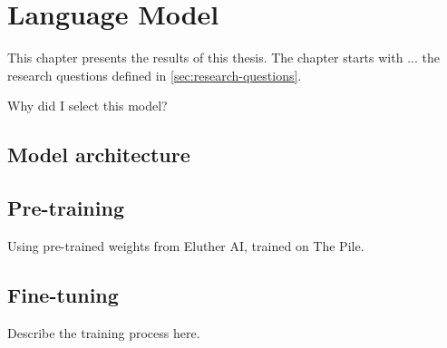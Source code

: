 \chapter{Language Model}
\label{chap:architecture}
This chapter presents the results of this thesis. The chapter starts with ... the research questions defined in \cref{sec:research-questions}.

Why did I select this model?

\section{Model architecture}
\label{sec:architecture}

\section{Pre-training}
\label{sec:pretraining}
Using pre-trained weights from Eluther AI, trained on The Pile.

\section{Fine-tuning}
\label{sec:fine-tuning}

Describe the training process here.

